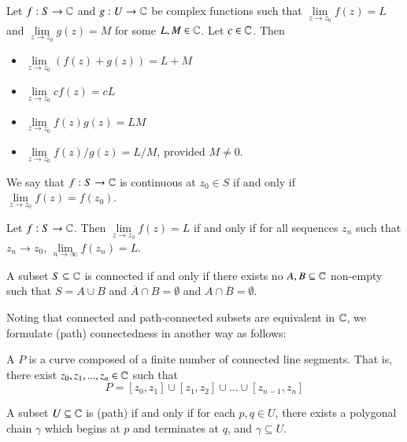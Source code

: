 \documentclass[12pt, a4paper, oneside, openright, titlepage]{book}
\begin{document}
\begin{thm}
    Let $f:S\rightarrow \mathbb C$ and $g:U\rightarrow \mathbb C$ be complex functions such that $\lim\limits_{z\rightarrow z_0}f(z) = L$ and $\lim\limits_{z\rightarrow z_0}g(z) = M$ for some $L,M \in \mathbb C$. Let $c \in \mathbb C$. Then\begin{itemize}
        \item $\lim\limits_{z\rightarrow z_0}(f(z)+g(z)) = L+M$
        \item $\lim\limits_{z\rightarrow z_0}cf(z) = cL$
        \item $\lim\limits_{z\rightarrow z_0}f(z)g(z) = LM$
        \item $\lim\limits_{z\rightarrow z_0}f(z)/g(z) = L/M$, provided $M \neq 0$.
    \end{itemize}
\end{thm}

\begin{defn}
    We say that $f:S\rightarrow \mathbb C$ is continuous at $z_0 \in S$ if and only if $\lim\limits_{z\rightarrow z_0}f(z) = f(z_0)$.
\end{defn}

\begin{thm}
    Let $f:S\rightarrow \mathbb C$. Then $\lim\limits_{z\rightarrow z_0}f(z) = L$ if and only if for all sequences $z_n$ such that $z_n\rightarrow z_0$, $\lim\limits_{n\rightarrow\infty}f(z_n) = L$.
\end{thm}


\begin{defn}
    A subset $S \subseteq \mathbb C$ is connected if and only if there exists no $A,B\subseteq \mathbb C$ non-empty such that $S = A\cup B$ and $\overline{A}\cap B = \emptyset$ and $A\cap \overline{B} = \emptyset$.
\end{defn}

Noting that connected and path-connected subsets are equivalent in $\mathbb C$, we formulate (path) connectedness in another way as follows:

\begin{defn}
    A  $P$ is a curve composed of a finite number of connected line segments. That is, there exist $z_0,z_1,...,z_n \in \mathbb C$ such that \begin{equation*}
        P = [z_0,z_1] \cup [z_1,z_2] \cup ... \cup [z_{n-1},z_n]
    \end{equation*}
\end{defn}

\begin{defn}
    A subset $U \subseteq \mathbb C$ is (path)  if and only if for each $p,q \in U$, there exists a polygonal chain $\gamma$ which begins at $p$ and terminates at $q$, and $\gamma \subseteq U$.
\end{defn}
    
\end{document}
